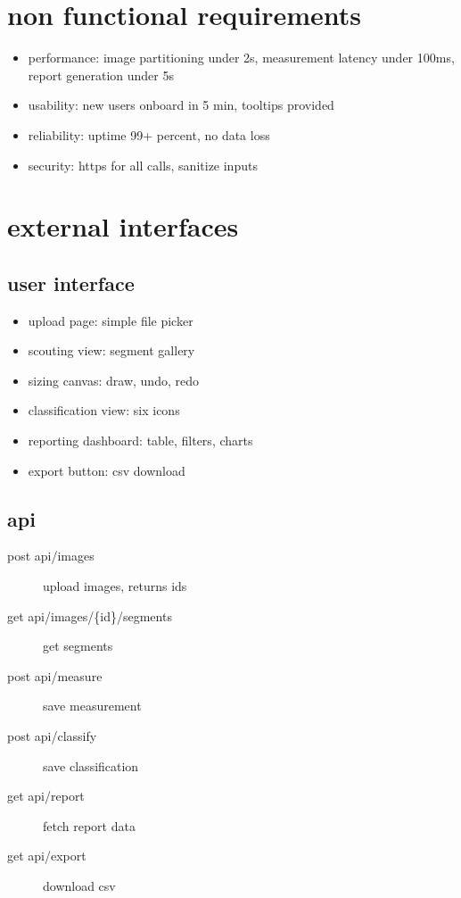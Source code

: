 \documentclass{article}
\begin{document}
\section{non functional requirements}
\begin{itemize}
  \item performance: image partitioning under 2s, measurement latency under 100ms, report generation under 5s
  \item usability: new users onboard in 5 min, tooltips provided
  \item reliability: uptime 99+ percent, no data loss
  \item security: https for all calls, sanitize inputs
\end{itemize}

\section{external interfaces}
\subsection{user interface}
\begin{itemize}
  \item upload page: simple file picker
  \item scouting view: segment gallery
  \item sizing canvas: draw, undo, redo
  \item classification view: six icons
  \item reporting dashboard: table, filters, charts
  \item export button: csv download
\end{itemize}

\subsection{api}
\begin{description}
  \item[post api/images] upload images, returns ids
  \item[get api/images/\{id\}/segments] get segments
  \item[post api/measure] save measurement
  \item[post api/classify] save classification
  \item[get api/report] fetch report data
  \item[get api/export] download csv
\end{description}
\end{document}

